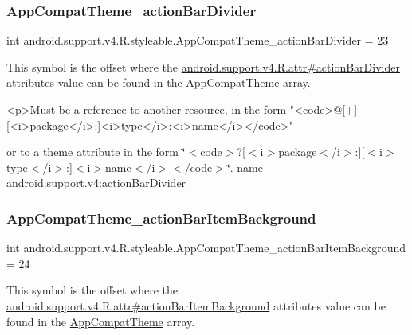 \subsubsection{\texorpdfstring{App\+Compat\+Theme\+\_\+action\+Bar\+Divider}{AppCompatTheme\_actionBarDivider}}
{\footnotesize\ttfamily int android.\+support.\+v4.\+R.\+styleable.\+App\+Compat\+Theme\+\_\+action\+Bar\+Divider = 23\hspace{0.3cm}{\ttfamily [static]}}

This symbol is the offset where the \hyperlink{classandroid_1_1support_1_1v4_1_1R_1_1attr_a1bf91491acf275f74ac54e879a7b901d}{android.\+support.\+v4.\+R.\+attr\#action\+Bar\+Divider} attribute\textquotesingle{}s value can be found in the \hyperlink{classandroid_1_1support_1_1v4_1_1R_1_1styleable_ac07ebbe62ed977f6dcaadc6397840ace}{App\+Compat\+Theme} array.

\begin{DoxyVerb}      <p>Must be a reference to another resource, in the form "<code>@[+][<i>package</i>:]<i>type</i>:<i>name</i></code>"
\end{DoxyVerb}
 or to a theme attribute in the form \char`\"{}$<$code$>$?\mbox{[}$<$i$>$package$<$/i$>$\+:\mbox{]}\mbox{[}$<$i$>$type$<$/i$>$\+:\mbox{]}$<$i$>$name$<$/i$>$$<$/code$>$\char`\"{}.  name android.\+support.\+v4\+:action\+Bar\+Divider \mbox{\label{classandroid_1_1support_1_1v4_1_1R_1_1styleable_a60558b418ddb9737883935cae40a928c}} 
\subsubsection{\texorpdfstring{App\+Compat\+Theme\+\_\+action\+Bar\+Item\+Background}{AppCompatTheme\_actionBarItemBackground}}
{\footnotesize\ttfamily int android.\+support.\+v4.\+R.\+styleable.\+App\+Compat\+Theme\+\_\+action\+Bar\+Item\+Background = 24\hspace{0.3cm}{\ttfamily [static]}}

This symbol is the offset where the \hyperlink{classandroid_1_1support_1_1v4_1_1R_1_1attr_ade0a8e19fe51b03f278175172436a2f5}{android.\+support.\+v4.\+R.\+attr\#action\+Bar\+Item\+Background} attribute\textquotesingle{}s value can be found in the \hyperlink{classandroid_1_1support_1_1v4_1_1R_1_1styleable_ac07ebbe62ed977f6dcaadc6397840ace}{App\+Compat\+Theme} array.

